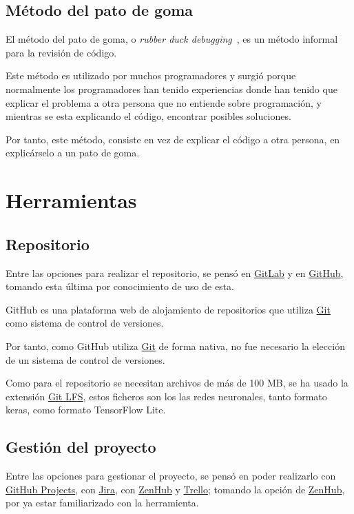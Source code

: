 \subsection{Método del pato de goma}

    El método del pato de goma, o \textit{rubber duck debugging}~\cite{rubber-duck-debugging}, es un método informal para la revisión de código.

    Este método es utilizado por muchos programadores y surgió porque normalmente los programadores han tenido experiencias donde han tenido que explicar el problema a otra persona que no entiende sobre programación, y mientras se esta explicando el código, encontrar posibles soluciones. 
    
    Por tanto, este método, consiste en vez de explicar el código a otra persona, en explicárselo a un pato de goma.

\section{Herramientas}

    \subsection{Repositorio}
        Entre las opciones para realizar el repositorio, se pensó en \href{https://gitlab.com/}{GitLab} y en \href{https://github.com/}{GitHub}, tomando esta última por conocimiento de uso de esta.

        GitHub es una plataforma web de alojamiento de repositorios que utiliza \href{https://git-scm.com/}{Git} como sistema de control de versiones.

        Por tanto, como GitHub utiliza \href{https://git-scm.com/}{Git} de forma nativa, no fue necesario la elección de un sistema de control de versiones.

        Como para el repositorio se necesitan archivos de más de 100 MB, se ha usado la extensión \href{https://git-lfs.com/}{Git LFS}, estos ficheros son los las redes neuronales, tanto formato keras, como formato TensorFlow Lite.
    \subsection{Gestión del proyecto}
        Entre las opciones para gestionar el proyecto, se pensó en poder realizarlo con \href{https://github.com/}{GitHub Projects}, con \href{https://www.atlassian.com/es/software/jira}{Jira}, con \href{https://www.zenhub.com/}{ZenHub} y \href{https://trello.com/}{Trello}; tomando la opción de \href{https://www.zenhub.com/}{ZenHub}, por ya estar familiarizado con la herramienta.

